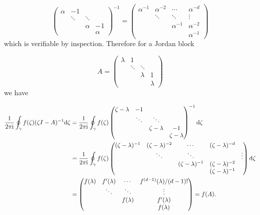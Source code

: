 \documentclass[12pt,a4paper]{article}
\def\D{ {\rm d} }
\def\I{ {\rm i} }
\def\sopmatrix#1{ \begin{pmatrix}#1\end{pmatrix} }
\begin{document}
\[
\sopmatrix{\alpha  & -1 \\
            & \ddots &\ddots \\
            &&\alpha & -1 \\ &&& \alpha}^{-1} = \sopmatrix{\alpha^{-1} & \alpha^{-2} & \cdots & \alpha^{-d} \\
                                                                    & \ddots& \ddots&\vdots \\
                                                                    & & \alpha^{-1} & \alpha^{-2} \\
                                                                    &&& \alpha^{-1}}
\]
which is verifiable by inspection. Therefore for a Jordan block

\[
A =\sopmatrix{\lambda  & 1 \\
            & \ddots &\ddots \\
            &&\lambda & 1 \\ &&& \lambda}
\]
we have


\begin{align*}
{1 \over 2 \pi \I} \oint_\gamma f(\zeta)(\zeta I - A)^{-1} \D \zeta
&=
{1 \over 2 \pi \I} \oint_\gamma f(\zeta) \sopmatrix{\zeta - \lambda  & -1 \\
            & \ddots &\ddots \\
            &&\zeta - \lambda & -1 \\ &&& \zeta - \lambda}^{-1} \D \zeta \\
&=
{1 \over 2 \pi \I} \oint_\gamma f(\zeta) \sopmatrix{(\zeta-\lambda)^{-1} & (\zeta-\lambda)^{-2} & \cdots & (\zeta-\lambda)^{-d} \\
                                                                    & \ddots& \ddots&  &\vdots \\
                                                                    & & (\zeta-\lambda)^{-1} & (\zeta-\lambda)^{-2} \\
                                                                    &&& (\zeta-\lambda)^{-1}} \D \zeta \\
&= \begin{pmatrix} f(\lambda) & f'(\lambda) & \cdots & f^{(d-1)}(\lambda)/(d-1)! \\
        & \ddots & \ddots & \vdots \\
            & & f(\lambda) & f'(\lambda)\\
            &&& f(\lambda)
            \end{pmatrix} = f(A).
\end{align*}
\end{document}

